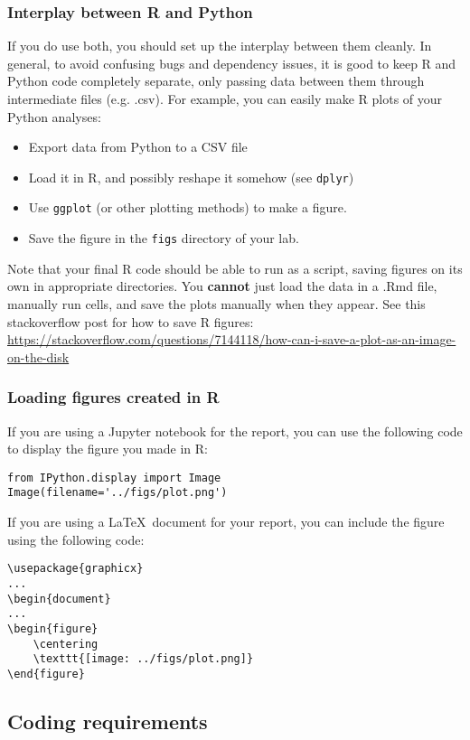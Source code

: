 \documentclass[letterpaper,12pt]{article}
\begin{document}
\subsubsection{Interplay between R and Python}
If you do use both, you should set up the interplay between them cleanly. In general, to avoid confusing bugs and dependency issues, it is good to keep R and Python code completely separate, only passing data between them through intermediate files (e.g. .csv). For example, you can easily make R plots of your Python analyses:
\begin{itemize}
    \item Export data from Python to a CSV file
    \item Load it in R, and possibly reshape it somehow (see \texttt{dplyr})
    \item Use \texttt{ggplot} (or other plotting methods) to make a figure.
    \item Save the figure in the \texttt{figs} directory of your lab.
\end{itemize}
Note that your final R code should be able to run as a script, saving figures on its own in appropriate directories. You \textbf{cannot} just load the data in a .Rmd file, manually run cells, and save the plots manually when they appear. See this stackoverflow post for how to save R figures: \url{https://stackoverflow.com/questions/7144118/how-can-i-save-a-plot-as-an-image-on-the-disk}
\subsubsection{Loading figures created in R}
If you are using a Jupyter notebook for the report, you can use the following code to display the figure you made in R:
\begin{verbatim}
from IPython.display import Image
Image(filename='../figs/plot.png')
\end{verbatim}
If you are using a \LaTeX\ document for your report, you can include the figure using the following code:
\begin{verbatim}
\usepackage{graphicx}
...
\begin{document}
...
\begin{figure}
    \centering
    \texttt{[image: ../figs/plot.png]}
\end{figure}
\end{verbatim}

\subsection{Coding requirements}
\end{document}
